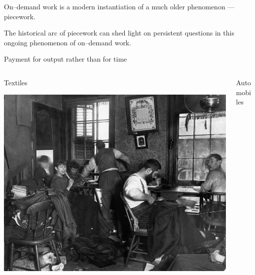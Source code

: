 \documentclass[presentation]{subfiles}
\begin{document}
\begin{frame}[standout,label=takeaway]
  On--demand work is a modern instantiation of a much older phenomenon
  --- {piecework}.

  {\normalsize The historical arc of piecework
  can shed light on persistent questions
  in this ongoing phenomenon of on--demand work.}
\end{frame}


\begin{frame}[t]{Payment for output rather than for time}
  \begin{columns}[T]
    \begin{column}{0.33\textwidth}
      \centering
      Textiles

      \vspace{0.5em}

      \includegraphics[max width=\linewidth,max height=.3\textheight,keepaspectratio]{../common_figures/pieceworkers.jpg}
    \end{column}
    \begin{column}{0.33\textwidth}
      \centering
      Automobiles

      \vspace{0.5em}


\end{column}
\end{columns}
\end{frame}
\end{document}
